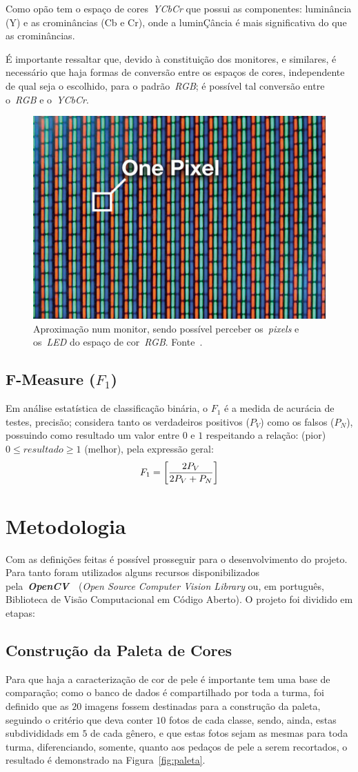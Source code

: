 \documentclass[conference]{Trabalho_1}
\begin{document}
Como op\~ao tem o espa\c{c}o de cores~\textit{YCbCr} que possui as componentes: lumin\^ancia (Y) e as cromin\^ancias (Cb e Cr), onde a lumin\c{C}\^ancia \'e mais significativa do que as cromin\^ancias.

\'E importante ressaltar que, devido \`a constitui\c{c}\~ao dos monitores, e similares, \'e necess\'ario que haja formas de convers\~ao entre os espa\c{c}os de cores, independente de qual seja o escolhido, para o padr\~ao~\textit{RGB}; \'e poss\'ivel tal convers\~ao entre o~\textit{RGB} e o~\textit{YCbCr}.

\begin{figure}[]
  \centering
  \includegraphics[width = 4.5 cm]{monitorpixel}
  \caption{Aproxima\c{c}\~ao num monitor, sendo poss\'ivel perceber os~\textit{pixels} e os~\textit{LED} do espa\c{c}o de cor~\textit{RGB}. Fonte~\cite{monitor}.}
  \label{fig:monitorpixel}
\end{figure}

\subsection{F-Measure ($F_1$)}
Em an\'alise estat\'istica de classifica\c{c}\~ao bin\'aria, o $F_1$ \'e a medida de acur\'acia de testes, precis\~ao; considera tanto os verdadeiros positivos ($P_V$) como os falsos ($P_N$), possuindo como resultado um valor entre $0$ e $1$ respeitando a rela\c{c}\~ao: (pior) $0 \leq resultado \geq 1$ (melhor), pela express\~ao geral:
$$F_1 = \left[{{2P_V} \over {2P_V + P_N}}\right]$$



\section{Metodologia}
Com as defini\c{c}\~oes feitas \'e poss\'ivel prosseguir para o desenvolvimento do projeto. Para tanto foram utilizados alguns recursos disponibilizados pela~\textbf{\textit{OpenCV}}~\cite{opencv}~(\textit{Open Source Computer Vision Library} ou, em portugu\^es, Biblioteca de Vis\~ao Computacional em C\'odigo Aberto). O projeto foi dividido em etapas:

\subsection{Constru\c{c}\~ao da Paleta de Cores}
Para que haja a caracteriza\c{c}\~ao de cor de pele \'e importante tem uma base de compara\c{c}\~ao; como o banco de dados \'e compartilhado por toda a turma, foi definido que as $20$ imagens fossem destinadas para a constru\c{c}\~ao da paleta, seguindo o crit\'erio que deva conter $10$ fotos de cada classe, sendo, ainda, estas subdivididads em $5$ de cada g\^enero, e que estas fotos sejam as mesmas para toda turma, diferenciando, somente, quanto aos peda\c{c}os de pele a serem recortados, o resultado \'e demonstrado na Figura~\ref{fig:paleta}.
\end{document}
